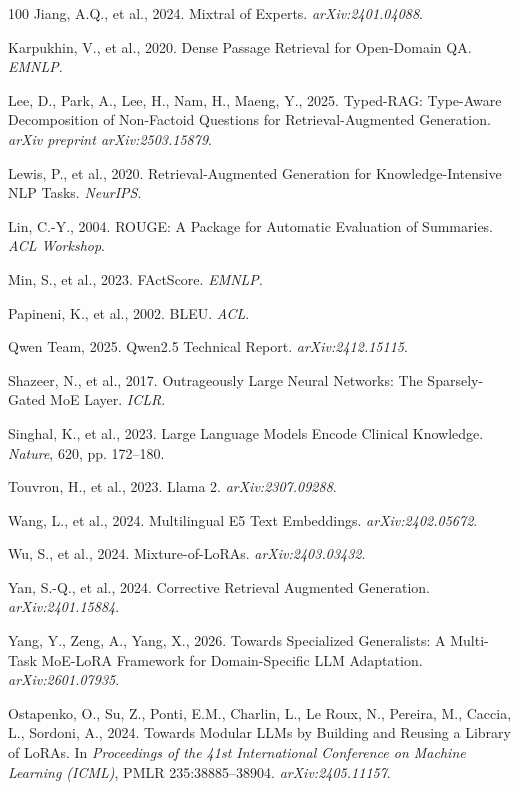 \documentclass[a4paper,fleql]{cas-sc}
\begin{document}
\begin{thebibliography}{100}
Jiang, A.Q., et al., 2024. Mixtral of Experts. \textit{arXiv:2401.04088}.


Karpukhin, V., et al., 2020. Dense Passage Retrieval for Open-Domain QA. \textit{EMNLP}.

Lee, D., Park, A., Lee, H., Nam, H., Maeng, Y., 2025. Typed-RAG: Type-Aware
Decomposition of Non-Factoid Questions for Retrieval-Augmented Generation.
\textit{arXiv preprint arXiv:2503.15879}.

Lewis, P., et al., 2020. Retrieval-Augmented Generation for Knowledge-Intensive NLP Tasks. \textit{NeurIPS}.

Lin, C.-Y., 2004. ROUGE: A Package for Automatic Evaluation of Summaries. \textit{ACL Workshop}.


Min, S., et al., 2023. FActScore. \textit{EMNLP}.

Papineni, K., et al., 2002. BLEU. \textit{ACL}.

Qwen Team, 2025. Qwen2.5 Technical Report. \textit{arXiv:2412.15115}.


Shazeer, N., et al., 2017. Outrageously Large Neural Networks: The Sparsely-Gated MoE Layer. \textit{ICLR}.

Singhal, K., et al., 2023. Large Language Models Encode Clinical Knowledge. \textit{Nature}, 620, pp. 172--180.

Touvron, H., et al., 2023. Llama 2. \textit{arXiv:2307.09288}.

Wang, L., et al., 2024. Multilingual E5 Text Embeddings. \textit{arXiv:2402.05672}.


Wu, S., et al., 2024. Mixture-of-LoRAs. \textit{arXiv:2403.03432}.

Yan, S.-Q., et al., 2024. Corrective Retrieval Augmented Generation. \textit{arXiv:2401.15884}.

Yang, Y., Zeng, A., Yang, X., 2026.
\newblock Towards Specialized Generalists: A Multi-Task MoE-LoRA Framework for Domain-Specific LLM Adaptation.
\newblock \textit{arXiv:2601.07935}.

Ostapenko, O., Su, Z., Ponti, E.M., Charlin, L., Le Roux, N., Pereira, M., Caccia, L., Sordoni, A., 2024.
\newblock Towards Modular LLMs by Building and Reusing a Library of LoRAs.
\newblock In \textit{Proceedings of the 41st International Conference on Machine Learning (ICML)}, PMLR 235:38885--38904.
\newblock \textit{arXiv:2405.11157}.


\end{thebibliography}
\end{document}
